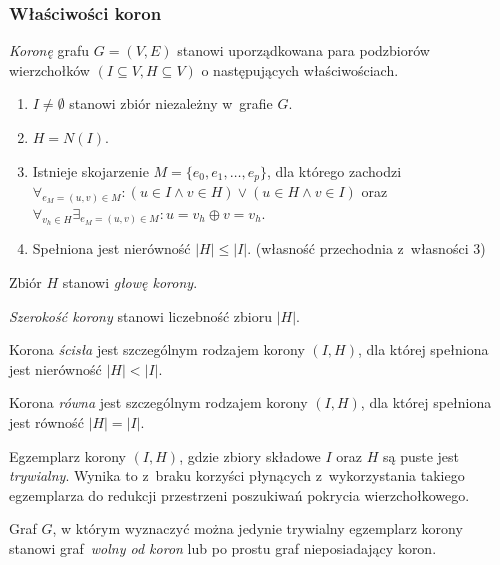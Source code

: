 \subsubsection{\textbf{Właściwości koron}}
\label{sss_kernelization_crown_main}
\begin{definition}
  \emph{Koronę} grafu $G=(V, E)$ stanowi uporządkowana para podzbiorów wierzchołków $(I \subseteq V, H \subseteq V)$ o następujących właściwościach.
  \begin{enumerate}
    \item $I \neq \emptyset$ stanowi zbiór niezależny w~grafie $G$.
    \item $H=N(I)$.
    \item Istnieje skojarzenie $M=\{e_0, e_1, \ldots, e_p\}$, dla którego zachodzi $\forall_{e_M=(u,v) \in M}: (u\in I \land v\in H) \lor (u \in H \land v \in I)$ oraz $\forall_{v_h \in H}\exists_{e_M=(u,v)\in M}: u = v_h \oplus v = v_h$.
    \item Spełniona jest nierówność $|H| \leq |I|$. (własność przechodnia z~własności 3)
  \end{enumerate}
\end{definition}
\begin{definition}
  Zbiór $H$ stanowi \emph{głowę korony}.
\end{definition}
\begin{definition}
  \emph{Szerokość korony} stanowi liczebność zbioru $|H|$.
\end{definition}
\begin{definition}
  Korona \emph{ścisła} jest szczególnym rodzajem korony $(I, H)$, dla której spełniona jest nierówność $|H| < |I|$.
\end{definition}
\begin{definition}
  Korona \emph{równa} jest szczególnym rodzajem korony $(I, H)$, dla której spełniona jest równość $|H| = |I|$.
\end{definition}
\begin{definition}
  Egzemplarz korony $(I, H)$, gdzie zbiory składowe $I$ oraz $H$ są puste jest \emph{trywialny}.
  Wynika to z~braku korzyści płynących z~wykorzystania takiego egzemplarza do redukcji przestrzeni poszukiwań pokrycia wierzchołkowego.
\end{definition}
\begin{definition}
  Graf $G$, w którym wyznaczyć można jedynie trywialny egzemplarz korony stanowi graf~\emph{wolny od koron} lub po prostu graf nieposiadający koron.
\end{definition}
